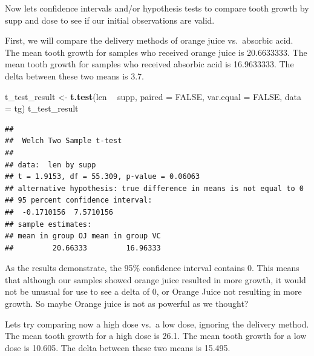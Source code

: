 \documentclass[]{article}
\newenvironment{Shaded}{\begin{snugshade}}{\end{snugshade}}
\newcommand{\DataTypeTok}[1]{\textcolor[rgb]{0.13,0.29,0.53}{#1}}
\newcommand{\DecValTok}[1]{\textcolor[rgb]{0.00,0.00,0.81}{#1}}
\newcommand{\FloatTok}[1]{\textcolor[rgb]{0.00,0.00,0.81}{#1}}
\newcommand{\KeywordTok}[1]{\textcolor[rgb]{0.13,0.29,0.53}{\textbf{#1}}}
\newcommand{\NormalTok}[1]{#1}
\newcommand{\OperatorTok}[1]{\textcolor[rgb]{0.81,0.36,0.00}{\textbf{#1}}}
\newcommand{\OtherTok}[1]{\textcolor[rgb]{0.56,0.35,0.01}{#1}}
\newcommand{\StringTok}[1]{\textcolor[rgb]{0.31,0.60,0.02}{#1}}
\begin{document}
Now lets confidence intervals and/or hypothesis tests to compare tooth
growth by supp and dose to see if our initial observations are valid.

First, we will compare the delivery methods of orange juice vs.~absorbic
acid. The mean tooth growth for samples who received orange juice is
20.6633333. The mean tooth growth for samples who received absorbic acid
is 16.9633333. The delta between these two means is 3.7.

\begin{Shaded}
\begin{Highlighting}[]
\NormalTok{t_test_result <-}\StringTok{ }\KeywordTok{t.test}\NormalTok{(len }\OperatorTok{~}\StringTok{ }\NormalTok{supp, }\DataTypeTok{paired =} \OtherTok{FALSE}\NormalTok{, }\DataTypeTok{var.equal =} \OtherTok{FALSE}\NormalTok{, }\DataTypeTok{data =}\NormalTok{ tg)}
\NormalTok{t_test_result}
\end{Highlighting}
\end{Shaded}

\begin{verbatim}
## 
##  Welch Two Sample t-test
## 
## data:  len by supp
## t = 1.9153, df = 55.309, p-value = 0.06063
## alternative hypothesis: true difference in means is not equal to 0
## 95 percent confidence interval:
##  -0.1710156  7.5710156
## sample estimates:
## mean in group OJ mean in group VC 
##         20.66333         16.96333
\end{verbatim}

As the results demonstrate, the 95\% confidence interval contains 0.
This means that although our samples showed orange juice resulted in
more growth, it would not be unusual for use to see a delta of 0, or
Orange Juice not resulting in more growth. So maybe Orange juice is not
as powerful as we thought?

Lets try comparing now a high dose vs.~a low dose, ignoring the delivery
method. The mean tooth growth for a high dose is 26.1. The mean tooth
growth for a low dose is 10.605. The delta between these two means is
15.495.

\begin{Shaded}
\end{Shaded}
\end{document}
